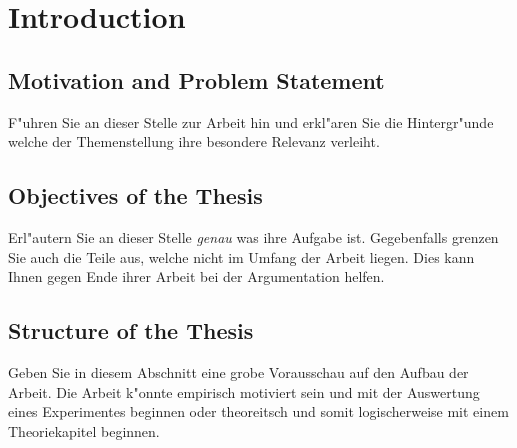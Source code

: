 \chapter[Introduction]{Introduction}

\section{Motivation and Problem Statement}

F"uhren Sie an dieser Stelle zur Arbeit hin und erkl"aren Sie die Hintergr"unde welche der Themenstellung ihre besondere Relevanz verleiht.

\section{Objectives of the Thesis}

Erl"autern Sie an dieser Stelle \emph{genau} was ihre Aufgabe ist. Gegebenfalls grenzen Sie auch die Teile aus, welche nicht im Umfang der Arbeit liegen. Dies kann Ihnen gegen Ende ihrer Arbeit bei der Argumentation helfen.

\section{Structure of the Thesis}

Geben Sie in diesem Abschnitt eine grobe Vorausschau auf den Aufbau der Arbeit. Die Arbeit k"onnte empirisch motiviert sein und mit der Auswertung eines Experimentes beginnen oder theoreitsch und somit logischerweise mit einem Theoriekapitel beginnen.
